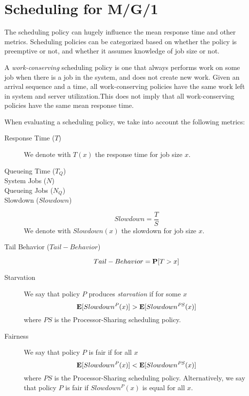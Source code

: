 \section{Scheduling for M/G/1}
\label{sec:Scheduling-M-G-1}

The scheduling policy can hugely influence the mean response time and other metrics.
Scheduling policies can be categorized based on whether the policy is preemptive or not, and whether it assumes knowledge of job size or not.

A \textit{work-conserving} scheduling policy is one that always performs work on some job when there is a job in the system, and does not create new work.
Given an arrival sequence and a time, all work-conserving policies have the same work left in system and server utilization.This does not imply that all work-conserving policies have the same mean response time.

When evaluating a scheduling policy, we take into account the following metrics:

\begin{description}
	
	\item [Response Time ($T$)]
	We denote with $T(x)$ the response time for job size $x$.
	
	\item [Queueing Time ($T_{Q}$)]
	
	\item [System Jobs ($N$)]
	
	\item [Queueing Jobs ($N_{Q}$)]
	
	\item [Slowdown ($Slowdown$)]
	\begin{equation}
	\label{eqn:Slowdown}
	Slowdown=\frac{T}{S}
	\end{equation}
	We denote with $Slowdown(x)$ the slowdown for job size $x$.
	
	\item [Tail Behavior ($Tail-Behavior$)]
	\begin{equation}
	\label{eqn:Tail-Behavior}
	Tail-Behavior=\probability{T>x}
	\end{equation}
	
	\item [Starvation]
	We say that policy $\mathit{P}$ produces \textit{starvation} if for some $x$
	\begin{equation}
	\label{eqn:Starvation}
	\expected{Slowdown^{\mathit{P}}(x)}>\expected{Slowdown^{\mathit{PS}}(x)}
	\end{equation}
	where $\mathit{PS}$ is the Processor-Sharing scheduling policy.
	
	\item [Fairness]
	We say that policy $\mathit{P}$ is fair if for all $x$
	\begin{equation}
	\label{eqn:Fairness}
	\expected{Slowdown^{\mathit{P}}(x)}<\expected{Slowdown^{\mathit{PS}}(x)}
	\end{equation}
	where $\mathit{PS}$ is the Processor-Sharing scheduling policy.
	Alternatively, we say that policy $\mathit{P}$ is fair if $Slowdown^{\mathit{P}}(x)$ is equal for all $x$.
	
\end{description}

